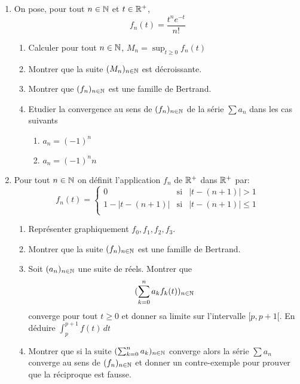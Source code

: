 \begin{enumerate}
\item On pose, pour tout $n\in \Bbb{N}$ et $t\in \Bbb{R}^{+}$,$$f_{n}(t)=\frac{t^{n}e^{-t}}{n!}$$
\begin{enumerate}
\item Calculer pour tout $n\in \Bbb{N}$, $M_{n}=\sup_{t\geq 0}f_{n}(t)$
\item Montrer que la suite $(M_n)_{n\in \Bbb{N}}$ est décroissante.
\item Montrer que $(f_n)_{n\in \Bbb{N}}$ est une famille de Bertrand.
\item Etudier la convergence au sens de $(f_{n})_{n\in \Bbb{N}}$ de la série $\sum a_{n}$ dans les cas suivants
\begin{enumerate}
\item $a_{n}=(-1)^{n}$
\item $a_{n}=(-1)^{n}n$
\end{enumerate}
\end{enumerate}

\item Pour tout $n\in \Bbb{N}$ on définit l'application $f_{n}$ de $\Bbb{R}^{+}$ dans $\Bbb{R}^{+}$ par:
\[f_{n}(t)=\left \{
\begin{array}{ccc}
0 & \mathrm{si} & |t-(n+1)|>1\\
1-|t-(n+1)| & \mathrm{si} & |t-(n+1)| \leq 1 \\
\end{array}
\right .
\]
\begin{enumerate}
\item Représenter graphiquement $f_{0},f_{1},f_{2},f_{3}$.
\item Montrer que la suite $(f_n)_{n\in \Bbb{N}}$ est une famille de Bertrand.
\item Soit $(a_n)_{n\in \Bbb{N}}$ une suite de réels. Montrer que $$(\sum _{k=0}^{n}a_{k}f_{k}(t))_{n\in \Bbb{N}}$$ converge pour tout $t\geq 0$ et donner sa limite sur l'intervalle $[p,p+1[$. En déduire $\int_{p}^{p+1}f(t)\,dt$
\item Montrer que si la suite $(\sum _{k=0}^{n}a_k)_{n\in \Bbb{N}}$ converge alors la série $\sum a_{n}$ converge au sens de $(f_n)_{n\in \Bbb{N}}$ et donner un contre-exemple pour prouver que la réciproque est fausse.
\end{enumerate}

\end{enumerate}

